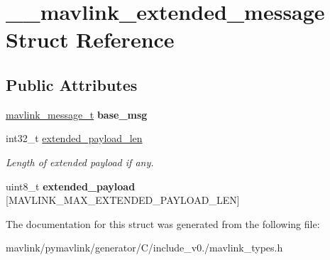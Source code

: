 \hypertarget{struct____mavlink__extended__message}{}\section{\+\_\+\+\_\+mavlink\+\_\+extended\+\_\+message Struct Reference}
\label{struct____mavlink__extended__message}
\subsection*{Public Attributes}
\begin{DoxyCompactItemize}
\item 
\mbox{\label{struct____mavlink__extended__message_a52d142dbcf71540bfc8199b45f676126}} 
\hyperlink{struct____mavlink__message}{mavlink\+\_\+message\+\_\+t} {\bfseries base\+\_\+msg}
\item 
\mbox{\label{struct____mavlink__extended__message_a7fcf54d2c29dc157a78caacae8d998cf}} 
int32\+\_\+t \hyperlink{struct____mavlink__extended__message_a7fcf54d2c29dc157a78caacae8d998cf}{extended\+\_\+payload\+\_\+len}
\begin{DoxyCompactList}\small\item\em Length of extended payload if any. \end{DoxyCompactList}\item 
\mbox{\label{struct____mavlink__extended__message_afccf6dc3341050b0a63ac0d069d66a31}} 
uint8\+\_\+t {\bfseries extended\+\_\+payload} \mbox{[}M\+A\+V\+L\+I\+N\+K\+\_\+\+M\+A\+X\+\_\+\+E\+X\+T\+E\+N\+D\+E\+D\+\_\+\+P\+A\+Y\+L\+O\+A\+D\+\_\+\+L\+EN\mbox{]}
\end{DoxyCompactItemize}


The documentation for this struct was generated from the following file\+:\begin{DoxyCompactItemize}
\item 
mavlink/pymavlink/generator/\+C/include\+\_\+v0./mavlink\+\_\+types.\+h\end{DoxyCompactItemize}
